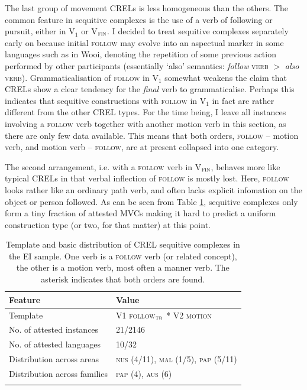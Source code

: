 The last group of movement CRELs is less homogeneous than the others. The common feature in sequitive complexes is the use of a verb of following or pursuit, either in V$_{1}$ or V$_{\textsc{fin}}$. I decided to treat sequitive complexes separately early on because initial \textsc{follow} may evolve into an aspectual marker in some languages such as in Wooi, denoting the repetition of some previous action performed by other participants (essentially `also' semantics: \textit{follow} \textsc{verb} $>$ \textit{also} \textsc{verb}). Grammaticalisation of \textsc{follow} in V$_{1}$ somewhat weakens the claim that CRELs show a clear tendency for the \emph{final} verb to grammaticalise. Perhaps this indicates that sequitive constructions with \textsc{follow} in V$_{1}$ in fact are rather different from the other CREL types. For the time being, I leave all instances involving a \textsc{follow} verb together with another motion verb in this section, as there are only few data available. This means that both orders, \textsc{follow} -- motion verb, and motion verb -- \textsc{follow}, are at present collapsed into one category.

The second arrangement, i.e. with a \textsc{follow} verb in V$_{\textsc{fin}}$, behaves more like typical CRELs in that verbal inflection of \textsc{follow} is mostly lost. Here, \textsc{follow} looks rather like an ordinary path verb, and often lacks explicit infomation on the object or person followed. As can be seen from Table \ref{table:basiccrelseq}, sequitive complexes only form a tiny fraction of attested MVCs making it hard to predict a uniform construction type (or two, for that matter) at this point.

\begin{table}
\begin{tabular}{ll}
\lsptoprule
Feature&Value\tabularnewline
\midrule
Template&V1 \textsc{follow$_{\textsc{tr}}$} * V2 \textsc{motion}\tabularnewline
No. of attested instances& 21/2146 \tabularnewline
No. of attested languages& 10/32 \tabularnewline
Distribution across areas& \textsc{nus} (4/11), \textsc{mal} (1/5), \textsc{pap} (5/11) \tabularnewline
Distribution across families& \textsc{pap} (4), \textsc{aus} (6) \tabularnewline
\lspbottomrule
\end{tabular}
\caption[Template and basic distribution of CREL sequitive complexes]{Template and basic distribution of CREL sequitive complexes in the EI sample. One verb is a \textsc{follow} verb (or related concept), the other is a motion verb, most often a manner verb. The asterisk indicates that both orders are found.}
\label{table:basiccrelseq}
\end{table}

